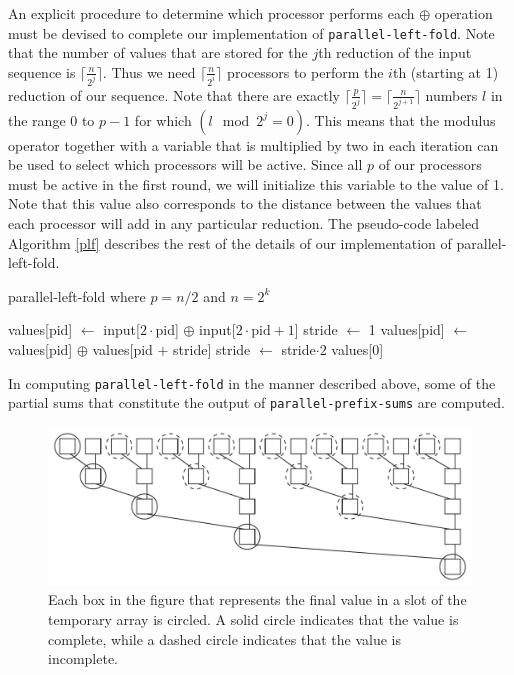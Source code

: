 \documentclass[12pt,twoside]{reedthesis}
\newcommand{\procedure}[1]{{\tt#1}}
\begin{document}
An explicit procedure to determine which processor performs each $\oplus$ operation must be devised to complete our implementation of \procedure{parallel-left-fold}. Note that the number of values that are stored for the $j$th reduction of the input sequence is $\lceil \frac{n}{2^j}\rceil$. Thus we need $\lceil \frac{n}{2^i} \rceil$ processors to perform the $i$th (starting at 1) reduction of our sequence. Note that there are exactly $\lceil \frac{p}{2^j} \rceil = \lceil \frac{n}{2^{j+1}} \rceil$ numbers $l$ in the range 0 to $p-1$ for which $(l \mod 2^j = 0)$. This means that the modulus operator together with a variable that is multiplied by two in each iteration can be used to select which processors will be active. Since all $p$ of our processors must be active in the first round, we will initialize this variable to the value of 1. Note that this value also corresponds to the distance between the values that each processor will add in any particular reduction. The pseudo-code labeled Algorithm \ref{plf} describes the rest of the details of our implementation of parallel-left-fold.


\begin{algorithm}[h!]
\label{plf}
\caption{parallel-left-fold where $p = n/2$ and $n=2^k$}
\begin{algorithmic}
\STATE values[pid] $\leftarrow$ input[$2\cdot \mbox{pid}$] $\oplus$ input[$2\cdot \mbox{pid} +1$]
\STATE stride $\leftarrow$ 1
\STATE values[pid] $\leftarrow$ values[pid] $\oplus$ values[pid $+$ stride] 
\STATE stride $\leftarrow$ stride$\cdot 2$
\ENDWHILE
\RETURN values[0]
\end{algorithmic}
\end{algorithm}

\pagebreak

In computing \procedure{parallel-left-fold} in the manner described above, some of the partial sums that constitute the output of \procedure{parallel-prefix-sums} are computed.

\begin{figure}[h!]
\begin{center}
\includegraphics[scale = .75]{correctsums.pdf}
\end{center}
\caption{Each box in the figure that represents the final value in a slot of the temporary array is circled. A solid circle indicates that the value is complete, while a dashed circle indicates that the value is incomplete.}
\label{nonumtree}
\end{figure}
\end{document}
